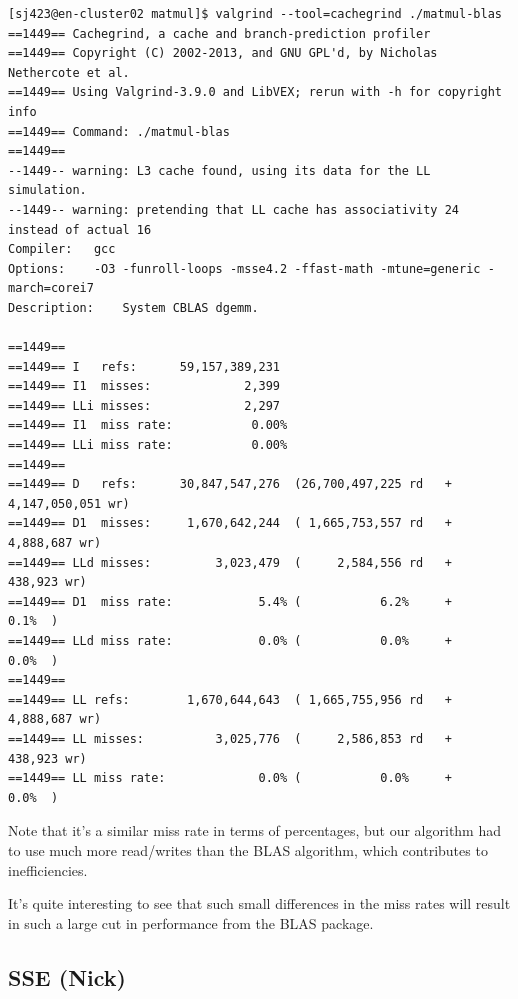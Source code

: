 \documentclass{article}
\begin{document}
    \begin{lstlisting}
[sj423@en-cluster02 matmul]$ valgrind --tool=cachegrind ./matmul-blas 
==1449== Cachegrind, a cache and branch-prediction profiler
==1449== Copyright (C) 2002-2013, and GNU GPL'd, by Nicholas Nethercote et al.
==1449== Using Valgrind-3.9.0 and LibVEX; rerun with -h for copyright info
==1449== Command: ./matmul-blas
==1449== 
--1449-- warning: L3 cache found, using its data for the LL simulation.
--1449-- warning: pretending that LL cache has associativity 24 instead of actual 16
Compiler:	gcc
Options:	-O3 -funroll-loops -msse4.2 -ffast-math -mtune=generic -march=corei7
Description:	System CBLAS dgemm.

==1449== 
==1449== I   refs:      59,157,389,231
==1449== I1  misses:             2,399
==1449== LLi misses:             2,297
==1449== I1  miss rate:           0.00%
==1449== LLi miss rate:           0.00%
==1449== 
==1449== D   refs:      30,847,547,276  (26,700,497,225 rd   + 4,147,050,051 wr)
==1449== D1  misses:     1,670,642,244  ( 1,665,753,557 rd   +     4,888,687 wr)
==1449== LLd misses:         3,023,479  (     2,584,556 rd   +       438,923 wr)
==1449== D1  miss rate:            5.4% (           6.2%     +           0.1%  )
==1449== LLd miss rate:            0.0% (           0.0%     +           0.0%  )
==1449== 
==1449== LL refs:        1,670,644,643  ( 1,665,755,956 rd   +     4,888,687 wr)
==1449== LL misses:          3,025,776  (     2,586,853 rd   +       438,923 wr)
==1449== LL miss rate:             0.0% (           0.0%     +           0.0%  )
    \end{lstlisting}

    Note that it's a similar miss rate in terms of percentages, but our algorithm had to
    use much more read/writes than the BLAS algorithm, which contributes to inefficiencies.

    It's quite interesting to see that such small differences in the miss rates will result in such a large cut in performance
    from the BLAS package.

    \subsection{SSE (Nick)}
\end{document}
